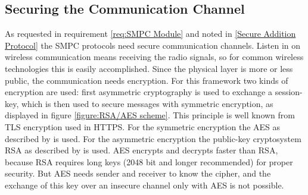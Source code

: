 	
		
		
		

	\FloatBarrier
	
	\subsection{Securing the Communication Channel} \label{Securing the Communication Channel}
	
	As requested in requirement \ref{req:SMPC Module} and noted in \ref{Secure Addition Protocol} the \gls{SMPC} protocols need secure communication channels. Listen in on wireless communication means receiving the radio signals, so for common wireless technologies this is easily accomplished. Since the physical layer is more or less public, the communication needs encryption. 
	For this framework two kinds of encryption are used: first asymmetric cryptography is used to exchange a session-key, which is then used to secure messages with symmetric encryption, as displayed in figure \ref{figure:RSA/AES scheme}. This principle is well known from \gls{TLS} encryption used in \gls{HTTPS}. For the symmetric encryption the \gls{AES} as described by \textcite[pp. 19-25]{Delfs2015} is used.
	For the asymmetric encryption the public-key cryptosystem \acs{RSA} as described by \textcite[pp. 49-76]{Delfs2015} is used.
	\gls{AES} encrypts and decrypts faster than \gls{RSA}, because \gls{RSA} requires long keys (2048 bit and longer recommended) for proper security. But \gls{AES} needs sender and receiver to know the cipher, and the exchange of this key over an insecure channel only with \gls{AES} is not possible.
	
